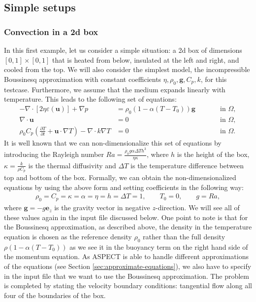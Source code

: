 \documentclass{article}
\newcommand{\aspect}{\textsc{ASPECT}}
\begin{document}
\subsection{Simple setups}
\label{sec:cookbooks-simple}

\subsubsection{Convection in a 2d box}
\label{sec:cookbooks-simple-box}

In this first example, let us consider a simple situation: a 2d box of dimensions
$[0,1]\times [0,1]$ that is heated from below, insulated at the left and right,
and cooled from the top. We will also consider the simplest model, the
incompressible Boussinesq approximation with constant coefficients
$\eta,\rho_0,\mathbf g,C_p, k$, for this testcase. Furthermore, we
assume that the medium expands linearly with
temperature. This leads to the following set of equations:
\begin{align}
  -\nabla \cdot \left[2\eta \varepsilon(\mathbf u)
                \right] + \nabla p &=
  \rho_0 (1-\alpha (T-T_0)) \mathbf g
  & \qquad
  & \textrm{in $\Omega$},
  \\
  \nabla \cdot \mathbf u &= 0
  & \qquad
  & \textrm{in $\Omega$},
  \\
  \rho_0 C_p \left(\frac{\partial T}{\partial t} + \mathbf
  u\cdot\nabla T\right) - \nabla\cdot k\nabla T
  &=
  0
  & \qquad
  & \textrm{in $\Omega$}.
\end{align}
It is well known that we can non-dimensionalize this set of equations by
introducing the Rayleigh number $Ra=\frac{\rho_0 g \alpha \Delta T h^3}{\eta \kappa}$, 
where $h$ is the height of the box, $\kappa = \frac{k}{\rho C_p}$ is the thermal diffusivity
and $\Delta T$ is the temperature difference between top and bottom of the box. Formally,
we can obtain the non-dimensionalized equations by using the above form and
setting coefficients in the following way:
\begin{align*}
  \rho_0=C_p=\kappa=\alpha=\eta=h=\Delta T=1, \qquad T_0=0, \qquad g=Ra,
\end{align*}
where $\mathbf g=-g \mathbf e_z$ is the gravity vector in negative
$z$-direction. 
We will see all of these values again in the input file discussed below.
One point to note is that for the Boussinesq approximation, as described above, the density 
in the temperature equation is chosen as the reference density $\rho_0$ rather than the 
full density $\rho(1-\alpha(T-T_0))$ as we see it in the buoyancy term on the right hand 
side of the momentum equation. As \aspect{} is able to handle different approximations 
of the equations (see Section \ref{sec:approximate-equations}), we also have to 
specify in the input file that we want to use the Boussinesq approximation.
The problem is completed by stating the velocity boundary conditions: tangential
flow along all four of the boundaries of the box.
\end{document}

